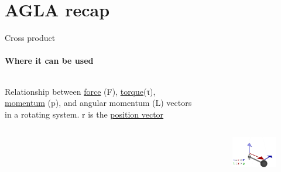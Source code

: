 \documentclass[aspectratio=169,xcolor=table,10pt, notes=hide]{beamer}
\begin{document}
\section*{AGLA recap}

\begin{frame}[t]{Cross product}
    \framesubtitle{Where it can be used}
    \begin{columns}[c,onlytextwidth]
        \begin{column}{0.49\textwidth}
            Relationship between \href{https://en.wikipedia.org/wiki/Force}{force} (F), \href{https://en.wikipedia.org/wiki/Torque}{torque}(τ), 
                \href{https://en.wikipedia.org/wiki/Momentum}{momentum} (p), and angular momentum 
                (L) vectors in a rotating system. r is the 
                \href{https://en.wikipedia.org/wiki/Position_(vector)}{position vector}  
        \end{column}
        \begin{column}{0.49\textwidth}
            \begin{figure}[H]
                \centering\includegraphics[height=6cm,width=1\textwidth,keepaspectratio]{../resources/image25.png}
            \end{figure}
        \end{column}
    \end{columns}
    \end{frame}
    
\end{document}
